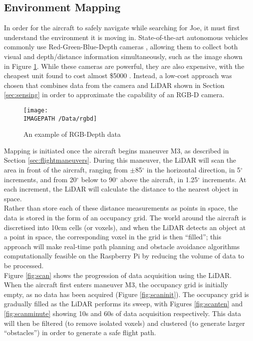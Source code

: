 \subsection{Environment Mapping}
In order for the aircraft to safely navigate while searching for Joe, it must first understand the environment it is moving in. State-of-the-art autonomous vehicles commonly use Red-Green-Blue-Depth cameras \cite{ref:rgbd}, allowing them to collect both visual and depth/distance information simultaneously, such as the image shown in Figure \ref{fig:rgbd}. While these cameras are powerful, they are also expensive, with the cheapest unit found to cost almost \$5000 \cite{ref:rgbdcost}. Instead, a low-cost approach was chosen that combines data from the camera and LiDAR shown in Section \ref{sec:sensing} in order to approximate the capability of an RGB-D camera.\\

\begin{figure}[!ht]
	\centering
	\texttt{[image: \\IMAGEPATH /Data/rgbd]}
	\caption{An example of RGB-Depth data}
	\label{fig:rgbd}
\end{figure}

Mapping is initiated once the aircraft begins maneuver M3, as described in Section \ref{sec:flightmaneuvers}. During this maneuver, the LiDAR will scan the area in front of the aircraft, ranging from $\pm$85$^\circ$ in the horizontal direction, in 5$^\circ$ increments, and from 20$^\circ$ below to 90$^\circ$ above the aircraft, in 1.25$^\circ$ increments. At each increment, the LiDAR will calculate the distance to the nearest object in space.\\

Rather than store each of these distance measurements as points in space, the data is stored in the form of an occupancy grid. The world around the aircraft is discretised into 10cm cells (or voxels), and when the LiDAR detects an object at a point in space, the corresponding voxel in the grid is then ``filled''; this approach will make real-time path planning and obstacle avoidance algorithms computationally feasible on the Raspberry Pi by reducing the volume of data to be processed.\\

Figure \ref{fig:scan} shows the progression of data acquisition using the LiDAR. When the aircraft first enters maneuver M3, the occupancy grid is initially empty, as no data has been acquired (Figure \ref{fig:scaninit}). The occupancy grid is gradually filled as the LiDAR performs its sweep, with Figures \ref{fig:scanten} and \ref{fig:scanminute} showing 10s and 60s of data acquisition respectively. This data will then be filtered (to remove isolated voxels) and clustered (to generate larger ``obstacles'') in order to generate a safe flight path.

